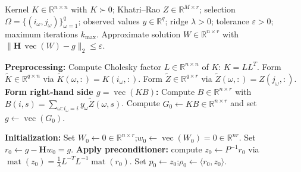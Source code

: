 \documentclass[12pt]{article}
\theoremstyle{definition}
\newcommand{\vecop}{\operatorname{vec}}
\newcommand{\matop}{\operatorname{mat}}
\newcommand{\R}{\mathbb{R}}
\newcommand{\Kt}{\widetilde{K}}
\newcommand{\Zt}{\widetilde{Z}}
\begin{document}
\begin{algorithm}[ht]
\caption{Preconditioned conjugate gradient (PCG) for
$\mathbf{H}\,\vecop(W)=(I_r\otimes K)\vecop(B)$}\label{alg:pcg}
\begin{algorithmic}[1]
\Require Kernel $K\in\R^{n\times n}$ with $K\succ 0$;
Khatri--Rao $Z\in\R^{M\times r}$;
selection $\Omega=\{(i_\omega,j_\omega)\}_{\omega=1}^q$;
observed values $y\in\R^q$;
ridge $\lambda>0$; tolerance $\varepsilon>0$; maximum iterations $k_{\max}$.
\Ensure Approximate solution $W\in\R^{n\times r}$ with $\|\mathbf{H}\,\vecop(W)-g\|_2\leq\varepsilon$.

\Statex \textbf{Preprocessing:}
\State Compute Cholesky factor $L\in\R^{n\times n}$ of $K$: $K=LL^T$. 
\State Form $\Kt\in\R^{q\times n}$ via $\Kt(\omega,:)=K(i_\omega,:)$. 
\State Form $\Zt\in\R^{q\times r}$ via $\Zt(\omega,:)=Z(j_\omega,:)$. 
\State \textbf{Form right-hand side $g=\vecop(KB)$:}
\State \quad Compute $B\in\R^{n\times r}$ with $B(i,s)=\sum_{\omega:i_\omega=i} y_\omega \Zt(\omega,s)$. 
\State \quad Compute $G_0\leftarrow K B\in\R^{n\times r}$ and set $g\leftarrow\vecop(G_0)$. 

\Statex \textbf{Initialization:}
\State Set $W_0\leftarrow 0\in\R^{n\times r}$;\quad $w_0\leftarrow\vecop(W_0)=0\in\R^{nr}$.
\State Set $r_0\leftarrow g - \mathbf{H}w_0 = g$.
\State \textbf{Apply preconditioner:} compute $z_0\leftarrow P^{-1}r_0$ via
       $\matop(z_0)=\tfrac{1}{\lambda}L^{-T}L^{-1}\matop(r_0)$.
\State Set $p_0\leftarrow z_0$;\quad $\rho_0\leftarrow \langle r_0,z_0\rangle$.


\end{algorithmic}
\end{algorithm}
\end{document}
